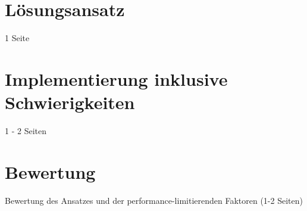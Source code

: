 \section{Lösungsansatz}
1 Seite

\section{Implementierung inklusive Schwierigkeiten}
1 - 2 Seiten

\section{Bewertung}
Bewertung des Ansatzes und der performance-limitierenden Faktoren (1-2 Seiten)

